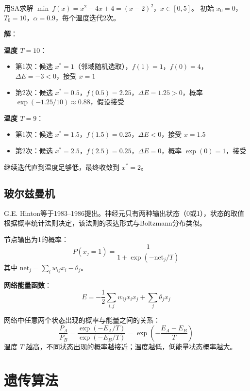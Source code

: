 \begin{example}[模拟退火求解函数极小值]\label{ex:sa}
用SA求解 $\min\ f(x) = x^2 - 4x + 4 = (x-2)^2$，$x \in [0, 5]$。
初始 $x_0 = 0$，$T_0 = 10$，$\alpha = 0.9$，每个温度迭代2次。

\textbf{解}：

\textbf{温度 $T = 10$}：
\begin{itemize}
    \item 第1次：候选 $x^* = 1$（邻域随机选取），$f(1) = 1$，$f(0) = 4$，$\Delta E = -3 < 0$，接受 $x = 1$
    \item 第2次：候选 $x^* = 0.5$，$f(0.5) = 2.25$，$\Delta E = 1.25 > 0$，概率 $\exp(-1.25/10) \approx 0.88$，假设接受
\end{itemize}

\textbf{温度 $T = 9$}：
\begin{itemize}
    \item 第1次：候选 $x^* = 1.5$，$f(1.5) = 0.25$，$\Delta E < 0$，接受 $x = 1.5$
    \item 第2次：候选 $x^* = 2.5$，$f(2.5) = 0.25$，$\Delta E = 0$，概率 $\exp(0) = 1$，接受
\end{itemize}

继续迭代直到温度足够低，最终收敛到 $x^* = 2$。
\end{example}

\subsection{玻尔兹曼机}

\begin{definition}[Boltzmann机]
G.E. Hinton等于1983--1986提出。神经元只有两种输出状态（0或1），状态的取值根据概率统计法则决定，该法则的表达形式与Boltzmann分布类似。

节点输出为1的概率：
\[
P(x_j = 1) = \frac{1}{1 + \exp(-\text{net}_j / T)}
\]
其中 $\text{net}_j = \sum_i w_{ij} x_i - \theta_j$。

\textbf{网络能量函数}：
\[
E = -\frac{1}{2}\sum_{i,j} w_{ij} x_i x_j + \sum_j \theta_j x_j
\]
\end{definition}

\begin{property}[Boltzmann分布]
网络中任意两个状态出现的概率与能量之间的关系：
\[
\frac{P_A}{P_B} = \frac{\exp(-E_A / T)}{\exp(-E_B / T)} = \exp\left(-\frac{E_A - E_B}{T}\right)
\]
温度 $T$ 越高，不同状态出现的概率越接近；温度越低，低能量状态概率越大。
\end{property}

\section{遗传算法}\label{sec:ga}

